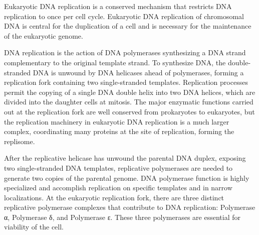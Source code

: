 Eukaryotic DNA replication is a conserved mechanism that restricts DNA replication to once per cell cycle. Eukaryotic DNA replication of chromosomal DNA is central for the duplication of a cell and is necessary for the maintenance of the eukaryotic genome.

DNA replication is the action of DNA polymerases synthesizing a DNA strand complementary to the original template strand. To synthesize DNA, the double-stranded DNA is unwound by DNA helicases ahead of polymerases, forming a replication fork containing two single-stranded templates. Replication processes permit the copying of a single DNA double helix into two DNA helices, which are divided into the daughter cells at mitosis. The major enzymatic functions carried out at the replication fork are well conserved from prokaryotes to eukaryotes, but the replication machinery in eukaryotic DNA replication is a much larger complex, coordinating many proteins at the site of replication, forming the replisome.

After the replicative helicase has unwound the parental DNA duplex, exposing two single-stranded DNA templates, replicative polymerases are needed to generate two copies of the parental genome. DNA polymerase function is highly specialized and accomplish replication on specific templates and in narrow localizations. At the eukaryotic replication fork, there are three distinct replicative polymerase complexes that contribute to DNA replication: Polymerase α, Polymerase δ, and Polymerase ε. These three polymerases are essential for viability of the cell.




